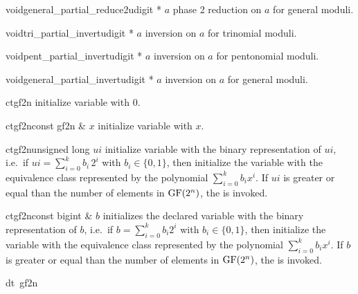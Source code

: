 \begin{Tfcode}{void}{general_partial_reduce2}{udigit * $a$}
  phase 2 reduction on $a$ for general moduli.
\end{Tfcode}

\begin{Tfcode}{void}{tri_partial_invert}{udigit * $a$}
  inversion on $a$ for trinomial moduli.
\end{Tfcode}

\begin{Tfcode}{void}{pent_partial_invert}{udigit * $a$}
  inversion on $a$ for pentonomial moduli.
\end{Tfcode}

\begin{Tfcode}{void}{general_partial_invert}{udigit * $a$}
  inversion on $a$ for general moduli.
\end{Tfcode}



\CONS

\begin{fcode}{ct}{gf2n}{}
  initialize variable with 0.
\end{fcode}

\begin{fcode}{ct}{gf2n}{const gf2n & $x$}
  initialize variable with $x$.
\end{fcode}

\begin{fcode}{ct}{gf2n}{unsigned long $ui$}
  initialize variable with the binary representation of $ui$, i.e.~if $ui = \sum_{i=0}^k
  b_i\,2^i$ with $b_i\in\{ 0, 1 \}$, then initialize the variable with the equivalence class
  represented by the polynomial $\sum_{i=0}^k b_i x^i$.  If $ui$ is greater or equal than the
  number of elements in $\mathrm{GF}(2^n)$, the \LEH is invoked.
\end{fcode}

\begin{fcode}{ct}{gf2n}{const bigint & $b$}
  initializes the declared variable with the binary representation of $b$, i.e.~if $b =
  \sum_{i=0}^k b_i 2^i$ with $b_i \in \{ 0, 1 \}$, then initialize the variable with the
  equivalence class represented by the polynomial $\sum_{i=0}^k b_i x^i$.  If $b$ is greater or
  equal than the number of elements in $\mathrm{GF}(2^n)$, the \LEH is invoked.
\end{fcode}

\begin{fcode}{dt}{~gf2n}{}
\end{fcode}


